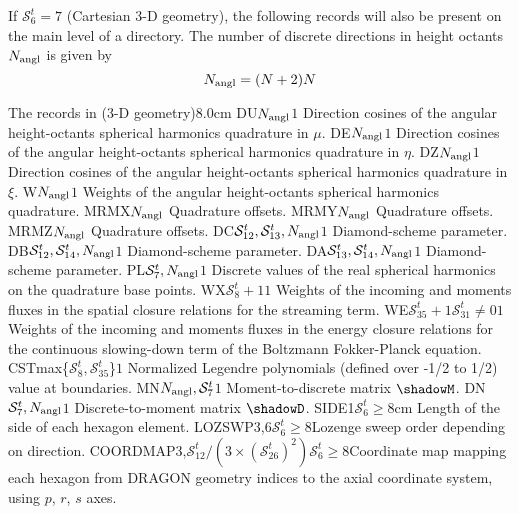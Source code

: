 If $\mathcal{S}^{t}_{6}=7$ (Cartesian 3-D geometry), the following records will also be present on the main level of a 
directory. The number of discrete directions in height octants  $N_{\rm angl}$ is given by
$$
N_{\rm angl}=(N+2)N
$$

\begin{DescriptionEnregistrement}{The  records in
 (3-D geometry)}{8.0cm}
\RealEnr
  {DU}{$N_{\rm angl}$}{$1$}
  {Direction cosines of the angular height-octants spherical harmonics quadrature in $\mu$.} 
\RealEnr
  {DE}{$N_{\rm angl}$}{$1$}
  {Direction cosines of the angular height-octants spherical harmonics quadrature in $\eta$.} 
\RealEnr
  {DZ}{$N_{\rm angl}$}{$1$}
  {Direction cosines of the angular height-octants spherical harmonics quadrature in $\xi$.} 
\RealEnr
  {W}{$N_{\rm angl}$}{$1$}
  {Weights of the angular height-octants spherical harmonics quadrature.} 
\IntEnr
  {MRMX}{$N_{\rm angl}$}
  {Quadrature offsets.} 
\IntEnr
  {MRMY}{$N_{\rm angl}$}
  {Quadrature offsets.} 
\IntEnr
  {MRMZ}{$N_{\rm angl}$}
  {Quadrature offsets.} 
\RealEnr
  {DC}{$\mathcal{S}^{t}_{12},\mathcal{S}^{t}_{13},N_{\rm angl}$}{$1$}
  {Diamond-scheme parameter.} 
\RealEnr
  {DB}{$\mathcal{S}^{t}_{12},\mathcal{S}^{t}_{14},N_{\rm angl}$}{$1$}
  {Diamond-scheme parameter.} 
\RealEnr
  {DA}{$\mathcal{S}^{t}_{13},\mathcal{S}^{t}_{14},N_{\rm angl}$}{$1$}
  {Diamond-scheme parameter.} 
\RealEnr
  {PL}{$\mathcal{S}^{t}_{7},N_{\rm angl}$}{$1$}
  {Discrete values of the real spherical harmonics on the quadrature base points.} 
\RealEnr
  {WX}{$\mathcal{S}^{t}_{8}+1$}{$1$}
  {Weights of the incoming and moments fluxes in the spatial closure relations for the streaming term.}
\OptRealEnr
  {WE}{$\mathcal{S}^{t}_{35}+1$}{$\mathcal{S}^{t}_{31}\neq0$}{$1$}
  {Weights of the incoming and moments fluxes in the energy closure relations for the continuous slowing-down term of the Boltzmann Fokker-Planck equation.}
\RealEnr
  {CST}{max\{$\mathcal{S}^{t}_{8},\mathcal{S}^{t}_{35}$\}}{$1$}
  {Normalized Legendre polynomials (defined over -1/2 to 1/2) value at boundaries.}
\RealEnr
  {MN}{$N_{\rm angl},\mathcal{S}^{t}_{7}$}{$1$}
  {Moment-to-discrete matrix $\shadowM$.} 
\RealEnr
  {DN}{$\mathcal{S}^{t}_{7},N_{\rm angl}$}{$1$}
  {Discrete-to-moment matrix $\shadowD$.} 
\OptRealEnr
  {SIDE}{1}{$\mathcal{S}^{t}_{6}\geq8$}{cm}
  {Length of the side of each hexagon element.} 
\OptIntEnr
  {LOZSWP}{3,6}{$\mathcal{S}^{t}_{6}\geq8$}{Lozenge sweep order depending on direction.} 
\OptIntEnr
  {COORDMAP}{3,$\mathcal{S}^{t}_{12}/(3\times(\mathcal{S}^{t}_{26})^2)$}{$\mathcal{S}^{t}_{6}\geq8$}{Coordinate map mapping each hexagon from DRAGON geometry indices to the axial coordinate system, using $p$, $r$, $s$ axes.} 
\end{DescriptionEnregistrement}

\eject
